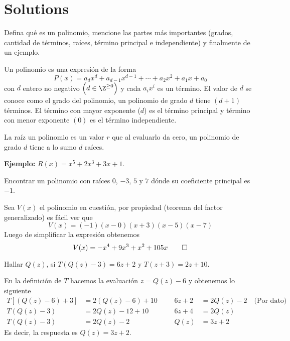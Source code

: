 \section*{Solutions}

\begin{prob}
    Defina qué es un polinomio, mencione las partes más importantes (grados, cantidad de términos, raíces, término principal e independiente) y finalmente de un ejemplo.
\end{prob}

\begin{solution}
    Un polinomio es una expresión de la forma
    \[
        P(x) = a_d x^d + a_{d - 1} x^{d - 1} + \cdots + a_2 x^2 + a_1 x + a_0
    \]
    con $d$ entero no negativo $\left(d \in \Z^{\geq 0}\right)$ y cada $a_i x^i$ es un término.
    El valor de $d$ se conoce como el grado del polinomio, un polinomio de grado $d$ tiene $(d + 1)$ términos.
    El término con mayor exponente ($d$) es el término principal y término con menor exponente $(0)$ es el término independiente.

    La raíz un polinomio es un valor $r$ que al evaluarlo da cero, un polinomio de grado $d$ tiene a lo sumo $d$ raíces.

    \textbf{Ejemplo:} $R(x) = x^5 + 2x^3 + 3x + 1$.
\end{solution}


\begin{prob}
    Encontrar un polinomio con raíces $0$, $-3$, $5$ y $7$ dónde su coeficiente principal es $-1$.
\end{prob}

\begin{solution}
    Sea $V(x)$ el polinomio en cuestión, por propiedad (teorema del factor generalizado) es fácil ver que
    \[
        V(x) = (-1)(x - 0)(x + 3)(x - 5)(x - 7)
    \]
    Luego de simplificar la expresión obtenemos
    \[
        V(x) = -x^4 + 9x^3 + x^2 + 105x \qedhere
    \]
\end{solution}


\begin{prob}
    Hallar $Q(z)$, si $T\left(Q(z) - 3\right) = 6z + 2$ y $T(z + 3) = 2z + 10$.
\end{prob}

\begin{solution}
    En la definición de $T$ hacemos la evaluación $z = Q(z) - 6$ y obtenemos lo siguiente
    \begin{align*}
        T\left[(Q(z) - 6) + 3\right] &= 2(Q(z) - 6) + 10 &&
        &6z + 2 &= 2Q(z) - 2 \quad \text{(Por dato)}\\
        T(Q(z) - 3) &= 2Q(z) - 12 + 10 &&
        &6z + 4 &= 2Q(z)\\
        T(Q(z) - 3) &= 2Q(z) - 2 &&
        &Q(z) &= 3z + 2
    \end{align*}
    Es decir, la respuesta es $Q(z) = 3z + 2$.
\end{solution}

